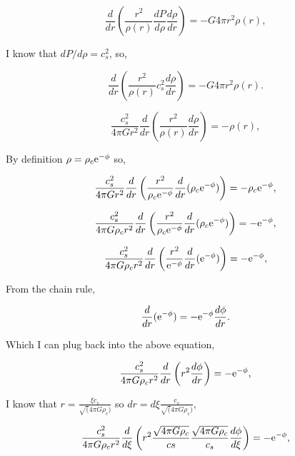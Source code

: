 \documentclass[12pt]{article}
\begin{document}
\begin{itemize}
\begin{equation}
\frac{d}{dr}\left(\frac{r^2}{\rho(r)}\frac{dP}{d\rho}\frac{d\rho}{dr}\right) = - G4\pi r^2 \rho(r),
\end{equation}


I know that $dP/d\rho = c_s^2$, so,


\begin{equation}
\frac{d}{dr}\left(\frac{r^2}{\rho(r)}c_s^2\frac{d\rho}{dr}\right) = - G4\pi r^2 \rho(r).
\end{equation}

\begin{equation}
\frac{c_s^2}{4\pi G r^2} \frac{d}{dr}\left(\frac{r^2}{\rho(r)}\frac{d\rho}{dr}\right) = - \rho(r), 
\end{equation}

By definition $\rho = \rho_c {\rm e}^{-\phi}$ so,

\begin{equation}
\frac{c_s^2}{4\pi G r^2} \frac{d}{dr}\left(\frac{r^2}{\rho_c {\rm e}^{-\phi}}\frac{d}{dr}(\rho_c {\rm e}^{-\phi}) \right) = - \rho_c {\rm e}^{-\phi}, 
\end{equation}

\begin{equation}
\frac{c_s^2}{4\pi G \rho_c r^2} \frac{d}{dr}\left(\frac{r^2}{\rho_c {\rm e}^{-\phi}}\frac{d}{dr}(\rho_c {\rm e}^{-\phi}) \right) = - {\rm e}^{-\phi}, 
\end{equation}

\begin{equation}
\frac{c_s^2}{4\pi G \rho_c r^2} \frac{d}{dr}\left(\frac{r^2}{{\rm e}^{-\phi}}\frac{d}{dr}({\rm e}^{-\phi}) \right) = - {\rm e}^{-\phi}, 
\end{equation}

From the chain rule,

\begin{equation}
\frac{d}{dr}({\rm e}^{-\phi}) = -{\rm e}^{-\phi}\frac{d\phi}{dr}.
\end{equation}

Which I can plug back into the above equation, 

\begin{equation}
\frac{c_s^2}{4\pi G \rho_c r^2} \frac{d}{dr}\left(r^2 \frac{d\phi}{dr} \right) = - {\rm e}^{-\phi}, 
\end{equation}


I know that $r = \frac{\xi c_s}{\sqrt(4\pi G \rho_c)}$ so $dr = d\xi \frac{c_s}{\sqrt(4\pi G \rho_c)}$,


\begin{equation}
\frac{c_s^2}{4\pi G \rho_c r^2} \frac{d}{d\xi}\left(r^2 \frac{\sqrt{4\pi G \rho_c }}{cs}\frac{\sqrt{4\pi G \rho_c }}{c_s} \frac{d\phi}{d\xi} \right) = - {\rm e}^{-\phi}, 
\end{equation}


\end{itemize}
\end{document}
